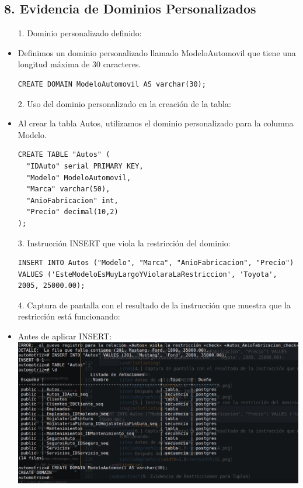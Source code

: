 \documentclass[12pt]{article}
\begin{document}
    \subsection*{8. Evidencia de Dominios Personalizados}
    \begin{itemize}
        \item[1.] Dominio personalizado definido:
            \item Definimos un dominio personalizado llamado ModeloAutomovil que tiene una longitud máxima de 30 caracteres.
        \begin{lstlisting}
CREATE DOMAIN ModeloAutomovil AS varchar(30);
        \end{lstlisting}
        \item[2.] Uso del dominio personalizado en la creación de la tabla:
            \item Al crear la tabla Autos, utilizamos el dominio personalizado para la columna Modelo.
        \begin{lstlisting}
CREATE TABLE "Autos" (
  "IDAuto" serial PRIMARY KEY,
  "Modelo" ModeloAutomovil,
  "Marca" varchar(50),
  "AnioFabricacion" int,
  "Precio" decimal(10,2)
);
        \end{lstlisting}
        \item[3.] Instrucción INSERT que viola la restricción del dominio:
        \begin{lstlisting}
INSERT INTO Autos ("Modelo", "Marca", "AnioFabricacion", "Precio") VALUES ('EsteModeloEsMuyLargoYViolaraLaRestriccion', 'Toyota', 2005, 25000.00);
        \end{lstlisting}
        \item[4.] Captura de pantalla con el resultado de la instrucción que muestra que la restricción está funcionando:
        \item Antes de aplicar INSERT:
        \center\includegraphics[width=1.0\textwidth]{D.png}

\end{itemize}
\end{document}
